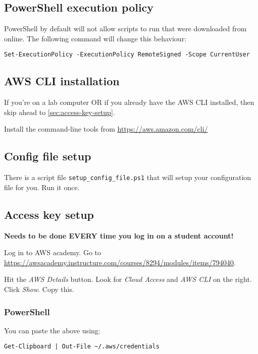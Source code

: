 \documentclass{pgnotes}
\begin{document}
\subsection{PowerShell execution policy}

PowerShell by default will not allow scripts to run that were downloaded from online.
The following command will change this behaviour: 
\begin{verbatim}
Set-ExecutionPolicy -ExecutionPolicy RemoteSigned -Scope CurrentUser
\end{verbatim}

\subsection{AWS CLI installation}

If you're on a lab computer OR if you already have the AWS CLI installed, then skip ahead to \autoref{sec:access-key-setup}.

Install the command-line tools from \url{https://aws.amazon.com/cli/}

\subsection{Config file setup}
\label{sec:config-file-setup}

There is a script file \texttt{setup\_config\_file.ps1} that will setup your configuration file for you.
Run it once.

\subsection{Access key setup}
\label{sec:access-key-setup}

\textbf{Needs to be done EVERY time you log in on a student account!}

Log in to AWS academy.
Go to \url{https://awsacademy.instructure.com/courses/8294/modules/items/794040}.

Hit the \textit{AWS Details} button.
Look for \textit{Cloud Access} and \textit{AWS CLI} on the right.
Click \textit{Show}.
Copy this.

\subsubsection{PowerShell}

You can paste the above using:

\begin{verbatim}
Get-Clipboard | Out-File ~/.aws/credentials
\end{verbatim}
\end{document}
